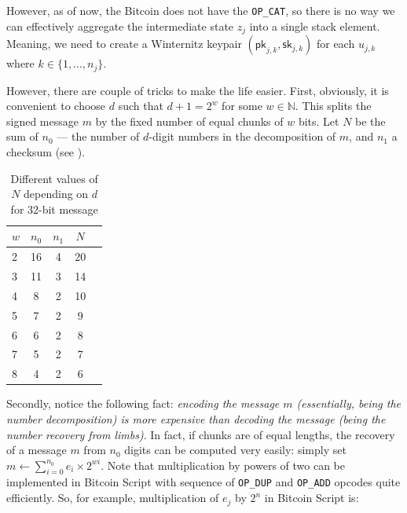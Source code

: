 \documentclass{iacrtrans}
\begin{document}
However, as of now, the Bitcoin does not have the \texttt{OP\_CAT}, so there is
no way we can effectively aggregate the intermediate state $z_j$ into a single
stack element. Meaning, we need to create a Winternitz keypair
$(\mathsf{pk}_{j,k}, \mathsf{sk}_{j,k})$ for each $u_{j,k}$ where $k \in
\{1,\dots,n_j\}$. 

However, there are couple of tricks to make the life easier. First, obviously,
it is convenient to choose $d$ such that $d+1=2^w$ for some $w \in \mathbb{N}$.
This splits the signed message $m$ by the fixed number of equal chunks of $w$
bits. Let $N$ be the sum of $n_0$ --- the number of $d$-digit numbers in the
decomposition of $m$, and $n_1$ a checksum (see ).

\begin{table}[h]
  \centering
  \begin{tabular}{lcccc}
    \toprule
    $w$ & $n_0$ & $n_1$ & $N$ \\
    \midrule
    2 & 16 & 4 & 20 \\
    3 & 11 & 3 & 14 \\
    4 & 8 & 2 & 10 \\
    5 & 7 & 2 & 9 \\
    6 & 6 & 2 & 8 \\
    7 & 5 & 2 & 7 \\
    8 & 4 & 2 & 6 \\
    \bottomrule
  \end{tabular}
  \caption{Different values of $N$ depending on $d$ for 32-bit
  message}\label{tab:winternitz}
\end{table}

Secondly, notice the following fact: \emph{encoding the message $m$
(essentially, being the number decomposition) is more expensive than decoding
the message (being the number recovery from limbs)}. In fact, if chunks are of
equal lengths, the recovery of a message $m$ from $n_0$ digits can be computed
very easily: simply set $m \gets \sum_{i=0}^{n_0} e_i \times 2^{wi}$. Note that
multiplication by powers of two can be implemented in Bitcoin Script with
sequence of \texttt{OP\_DUP} and \texttt{OP\_ADD} opcodes quite efficiently. So,
for example, multiplication of $e_j$ by $2^n$ in Bitcoin Script is:
\end{document}
